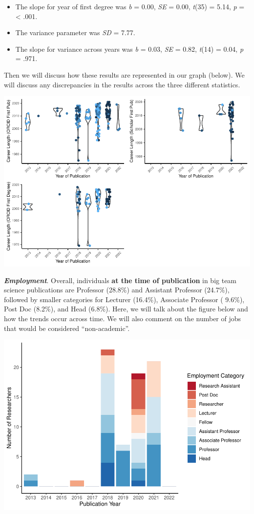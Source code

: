 \documentclass[
  man]{apa6}
\providecommand{\tightlist}{%
  \setlength{\itemsep}{0pt}\setlength{\parskip}{0pt}}
\begin{document}
\begin{itemize}
\tightlist
\item
  The slope for year of first degree was \emph{b} = 0.00, \emph{SE} = 0.00, \emph{t}(35) = 5.14, \emph{p} = \textless{} .001.
\item
  The variance parameter was \emph{SD} = 7.77.
\item
  The slope for variance across years was \emph{b} = 0.03, \emph{SE} = 0.82, \emph{t}(14) = 0.04, \emph{p} = .971.
\end{itemize}

Then we will discuss how these results are represented in our graph (below). We will discuss any discrepancies in the results across the three different statistics.

\includegraphics{04.manuscript_files/figure-latex/figure2-1.pdf}

\textbf{\emph{Employment}}. Overall, individuals \textbf{at the time of publication} in big team science publications are Professor (28.8\%) and Assistant Professor (24.7\%), followed by smaller categories for Lecturer (16.4\%), Associate Professor ( 9.6\%), Post Doc (8.2\%), and Head (6.8\%). Here, we will talk about the figure below and how the trends occur across time. We will also comment on the number of jobs that would be considered ``non-academic''.

\includegraphics{04.manuscript_files/figure-latex/figure3-1.pdf}
\end{document}
